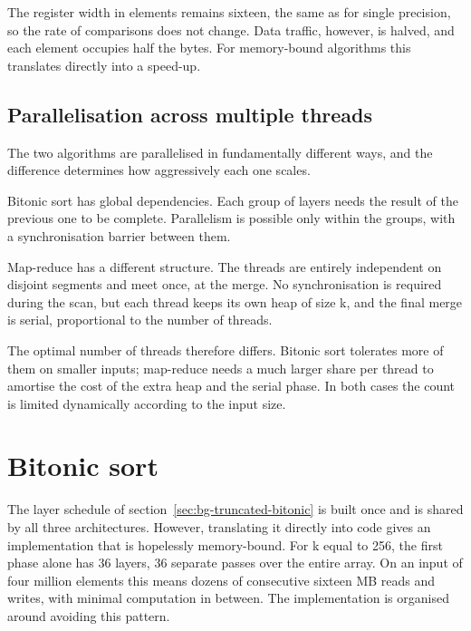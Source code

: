 The register width in elements remains sixteen, the same as for single
precision, so the rate of comparisons does not change. Data traffic, however,
is halved, and each element occupies half the bytes. For memory-bound
algorithms this translates directly into a speed-up.

\subsection{Parallelisation across multiple threads}
\label{sec:cpu-threads}

The two algorithms are parallelised in fundamentally different ways, and the
difference determines how aggressively each one scales.

Bitonic sort has global dependencies. Each group of layers needs the result of
the previous one to be complete. Parallelism is possible only within the
groups, with a synchronisation barrier between them.

Map-reduce has a different structure. The threads are entirely independent on
disjoint segments and meet once, at the merge. No synchronisation is required
during the scan, but each thread keeps its own heap of size k, and the final
merge is serial, proportional to the number of threads.

The optimal number of threads therefore differs. Bitonic sort tolerates more of
them on smaller inputs; map-reduce needs a much larger share per thread to
amortise the cost of the extra heap and the serial phase. In both cases the
count is limited dynamically according to the input size.

\section{Bitonic sort}
\label{sec:cpu-bitonic}

The layer schedule of section~\ref{sec:bg-truncated-bitonic} is built once and
is shared by all three architectures. However, translating it directly into
code gives an implementation that is hopelessly memory-bound. For k equal to
256, the first phase alone has 36 layers, 36 separate passes over the entire
array. On an input of four million elements this means dozens of consecutive
sixteen MB reads and writes, with minimal computation in between. The
implementation is organised around avoiding this pattern.

